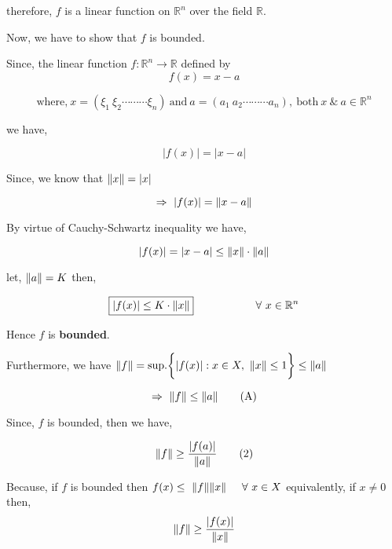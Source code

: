 \documentclass[a4paper,12pt]{article}
\begin{document}
    therefore, $f$ is a linear function on $\mathbb{R}^n$ over the field $\mathbb{R}$.

    Now, we have to show that $f$ is bounded.

    Since, the linear function $f : \mathbb{R}^n\to \mathbb{R}$ defined by
    \begin{equation*}
        f(x) = x - a \tag*{(1)}
    \end{equation*}

    \[\mbox{where,}\ x =\left(\xi_1\ \xi_2 \cdots \cdots \cdots \xi_n\right)\ \mbox{and}\ a =\left(a_1\ a_2 \cdots \cdots \cdots a_n\right),\ \mbox{both}\ x\  \&\  a\in \mathbb{R}^n\]
    
    we have,

    \[|f(x)| = |x-a|\]

    Since, we know that $\norm{x} = |x|$
    
    \[\Rightarrow\ |f(x)| = \norm{x-a}\]

    By virtue of Cauchy-Schwartz inequality we have,

    \[|f(x)| = |x-a| \leq \norm{x}\cdot \norm{a}\]

    let, $\norm{a} = K$ then,

    \[\boxed{|f(x)| \leq K\cdot \norm{x}} \hspace*{2cm} \forall\ x\in \mathbb{R}^n\]

    Hence $f$ is {\bf bounded}.

    \vspace*{0.3cm}
    Furthermore, we have $\norm{f} = \mbox{sup.}\biggl\{|f(x)| : x\in X,\ \norm{x} \leq 1\biggr\} \leq \norm{a}$

    \begin{equation*}
        \Rightarrow\ \norm{f} \leq \norm{a} \tag*{(A)}
    \end{equation*}

    Since, $f$ is bounded, then we have,

    \begin{equation*}
        \norm{f} \geq \frac{|f(a)|}{\norm{a}} \tag*{(2)}
    \end{equation*}

    \begin{tcolorbox}
        Because, if $f$ is bounded then $f(x) \leq\ \norm{f}\norm{x}\hspace*{0.5cm} \forall\ x\in X$ equivalently, if $x \neq 0$ then, 
        \[\norm{f} \geq \frac{|f(x)|}{\norm{x}}\]
    \end{tcolorbox}
\end{document}
